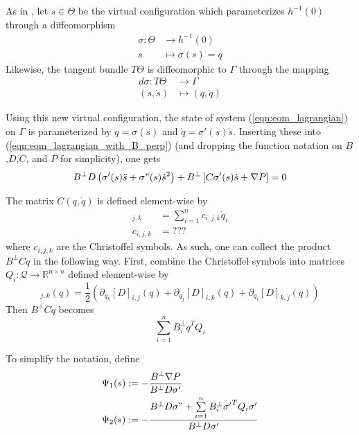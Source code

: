 As in \cite{lagrangian_structure_reduced_dynamics_vhcs}, 
let \(s \in \Theta\) be the virtual configuration which parameterizes
\(h^{-1}(0)\) through a diffeomorphism 
\begin{align*}
   \sigma : \Theta &\rightarrow h^{-1}(0) \\
   s &\mapsto \sigma(s) = q
\end{align*}
Likewise, the tangent bundle \(T\Theta\) is diffeomorphic to \(\Gamma\) 
through the mapping
\begin{align*}
   d\sigma : T\Theta &\rightarrow \Gamma \\
   (s,\dot{s}) &\mapsto (q,\dot{q})
\end{align*}

Using this new virtual configuration, the state of system
(\ref{eqn:eom_lagrangian}) on \(\Gamma\) 
is parameterized by \(q = \sigma(s)\) and \(\dot{q} = \sigma'(s)\dot{s}\).
Inserting these into (\ref{eqn:eom_lagrangian_with_B_perp}) (and dropping the
function notation on \(B\),\(D\),\(C\), and \(P\) for simplicity), one gets
\begin{align*}
   B^\perp D\left(\sigma'(s)\ddot{s} + \sigma"(s)\dot{s}^2 \right)
   + B^\perp \left[ C \sigma'(s)\dot{s} + \nabla P \right] = 0
\end{align*}

The matrix \(C(q,\dot{q})\) is defined element-wise by 
\begin{align*}
   [C]_{j,k} &= \sum \limits_{i=1}^n c_{i,j,k}\dot{q}_i \\
   c_{i,j,k} &= ???
\end{align*}
where \(c_{i,j,k}\) are the Christoffel symbols.
As such, one can collect the product \(B^\perp C \dot{q}\) in the following way.
First, combine the Christoffel symbols  into matrices
\(Q_i : \mathcal{Q} \rightarrow \mathbb{R}^{n \times n}\)
defined element-wise by
\begin{equation*}
   [Q_i]_{j,k}(q) = \frac{1}{2}\left(\partial_{q_k} [D]_{i,j}(q)
      + \partial_{q_j} [D]_{i,k}(q) 
      + \partial_{q_i} [D]_{k,j}(q)\right)
\end{equation*}
Then \(B^\perp C \dot{q}\) becomes
\begin{equation*}
   \sum \limits_{i=1}^n B_i^\perp \dot{q}^T Q_i
\end{equation*}

To simplify the notation, define 
\begin{align*}
   \Psi_1(s) &:= -\frac{B^\perp \nabla P}{B^\perp D \sigma'} \\
   \Psi_2(s) &:= -\frac{B^\perp D \sigma" + \sum\limits_{i=1}^n B_i^\perp
   {\sigma'}^T Q_i \sigma'}{B^\perp D \sigma'} 
\end{align*}

